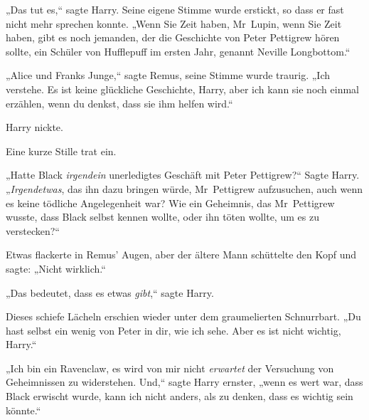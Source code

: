 „Das tut es,“ sagte Harry. Seine eigene Stimme wurde erstickt, so dass er fast nicht mehr sprechen konnte. „Wenn Sie Zeit haben, Mr~Lupin, wenn Sie Zeit haben, gibt es noch jemanden, der die Geschichte von Peter Pettigrew hören sollte, ein Schüler von Hufflepuff im ersten Jahr, genannt Neville Longbottom.“

„Alice und Franks Junge,“ sagte Remus, seine Stimme wurde traurig. „Ich verstehe. Es ist keine glückliche Geschichte, Harry, aber ich kann sie noch einmal erzählen, wenn du denkst, dass sie ihm helfen wird.“

Harry nickte.

Eine kurze Stille trat ein.

„Hatte Black \emph{irgendein} unerledigtes Geschäft mit Peter Pettigrew?“ Sagte Harry. „\emph{Irgendetwas}, das ihn dazu bringen würde, Mr~Pettigrew aufzusuchen, auch wenn es keine tödliche Angelegenheit war? Wie ein Geheimnis, das Mr~Pettigrew wusste, dass Black selbst kennen wollte, oder ihn töten wollte, um es zu verstecken?“

Etwas flackerte in Remus' Augen, aber der ältere Mann schüttelte den Kopf und sagte: „Nicht wirklich.“

„Das bedeutet, dass es etwas \emph{gibt},“ sagte Harry.

Dieses schiefe Lächeln erschien wieder unter dem graumelierten Schnurrbart. „Du hast selbst ein wenig von Peter in dir, wie ich sehe. Aber es ist nicht wichtig, Harry.“

„Ich bin ein Ravenclaw, es wird von mir nicht \emph{erwartet} der Versuchung von Geheimnissen zu widerstehen. Und,“ sagte Harry ernster, „wenn es wert war, dass Black erwischt wurde, kann ich nicht anders, als zu denken, dass es wichtig sein könnte.“

